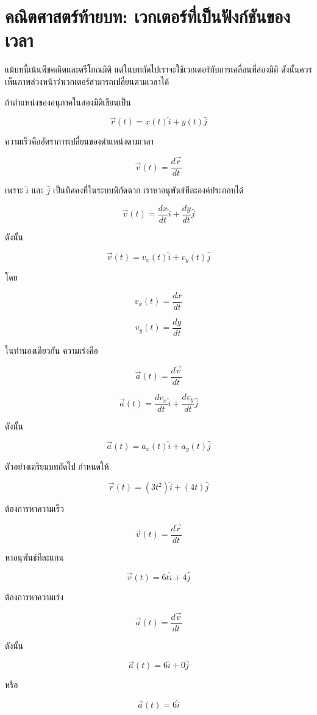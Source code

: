 \documentclass[12pt,a4paper]{report}
\begin{document}
\section{คณิตศาสตร์ท้ายบท: เวกเตอร์ที่เป็นฟังก์ชันของเวลา}

แม้บทนี้เน้นพีชคณิตและตรีโกณมิติ แต่ในบทถัดไปเราจะใช้เวกเตอร์กับการเคลื่อนที่สองมิติ ดังนั้นควรเห็นภาพล่วงหน้าว่าเวกเตอร์สามารถเปลี่ยนตามเวลาได้

ถ้าตำแหน่งของอนุภาคในสองมิติเขียนเป็น

\[
\vec{r}(t)=x(t)\hat{i}+y(t)\hat{j}
\]

ความเร็วคืออัตราการเปลี่ยนของตำแหน่งตามเวลา

\[
\vec{v}(t)=\frac{d\vec{r}}{dt}
\]

เพราะ $\hat{i}$ และ $\hat{j}$ เป็นทิศคงที่ในระบบพิกัดฉาก เราหาอนุพันธ์ทีละองค์ประกอบได้

\[
\vec{v}(t)=\frac{dx}{dt}\hat{i}+\frac{dy}{dt}\hat{j}
\]

ดังนั้น

\[
\vec{v}(t)=v_x(t)\hat{i}+v_y(t)\hat{j}
\]

โดย

\[
v_x(t)=\frac{dx}{dt}
\]

\[
v_y(t)=\frac{dy}{dt}
\]

ในทำนองเดียวกัน ความเร่งคือ

\[
\vec{a}(t)=\frac{d\vec{v}}{dt}
\]

\[
\vec{a}(t)=\frac{dv_x}{dt}\hat{i}+\frac{dv_y}{dt}\hat{j}
\]

ดังนั้น

\[
\vec{a}(t)=a_x(t)\hat{i}+a_y(t)\hat{j}
\]

\begin{examplebox}{ตัวอย่างเตรียมบทถัดไป}
กำหนดให้

\[
\vec{r}(t)=(3t^2)\hat{i}+(4t)\hat{j}
\]

ต้องการหาความเร็ว

\[
\vec{v}(t)=\frac{d\vec{r}}{dt}
\]

หาอนุพันธ์ทีละแกน

\[
\vec{v}(t)=6t\hat{i}+4\hat{j}
\]

ต้องการหาความเร่ง

\[
\vec{a}(t)=\frac{d\vec{v}}{dt}
\]

ดังนั้น

\[
\vec{a}(t)=6\hat{i}+0\hat{j}
\]

หรือ

\[
\vec{a}(t)=6\hat{i}
\]
\end{examplebox}
\end{document}
